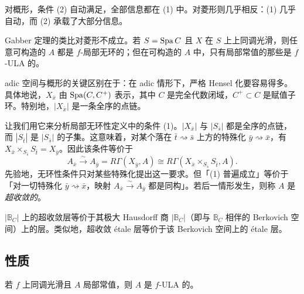 \begin{remark}
对概形，条件 (2) 自动满足，全部信息都在 (1) 中。对菱形则几乎相反：(1) 几乎自动，而 (2) 承载了大部分信息。
\end{remark}

\begin{example}
Gabber 定理的类比对菱形不成立。若 $S=\operatorname{Spa} C$ 且 $X$ 在 $S$ 上上同调光滑，则任意可构造的 $A$ 都是 $f$-局部无环的；但在可构造的 $A$ 中，只有局部常值的那些是 $f$-ULA 的。
\end{example}

\begin{center}
\end{center}
\begin{center}
\end{center}

\begin{remark}
adic 空间与概形的关键区别在于：在 adic 情形下，严格 Hensel 化要容易得多。具体地说，$X_{\bar x}$ 由 $\operatorname{Spa}(C,C^+)$ 表示，其中 $C$ 是完全代数闭域，$C^+\subset C$ 是赋值子环。特别地，$|X_{\bar x}|$ 是一条全序的点链。
\end{remark}

让我们用它来分析局部无环性定义中的条件 (1)。$|X_{\bar x}|$ 与 $|S_{\bar s}|$ 都是全序的点链，而 $|S_{\bar t}|$ 是 $|S_{\bar s}|$ 的子集。这意味着，对某个落在 $\bar t\rightsquigarrow\bar s$ 上方的特殊化 $\bar y\rightsquigarrow\bar x$，有 $X_{\bar x}\times_{S_{\bar s}}S_{\bar t}=X_{\bar y}$。因此该条件等价于
\[
A_{\bar x}\xrightarrow{\ \sim\ }A_{\bar y}=R\Gamma(X_{\bar y},A)\cong R\Gamma(X_{\bar x}\times_{S_{\bar s}}S_{\bar t},A).
\]
先验地，无环性条件只对某些特殊化提出这一要求。但「(1) 普遍成立」等价于「对一切特殊化 $\bar y\rightsquigarrow\bar x$，映射 $A_{\bar x}\xrightarrow{\sim}A_{\bar y}$ 都是同构」。若后一情形发生，则称 $A$ 是\emph{超收敛的}。

\begin{remark}
$|\mathbb B_C|$ 上的超收敛层等价于其极大 Hausdorff 商 $|\mathbb B_C|$（即与 $\mathbb B_C$ 相伴的 Berkovich 空间）上的层。类似地，超收敛 étale 层等价于该 Berkovich 空间上的 étale 层。
\end{remark}


\subsection{性质}

\begin{lemma}
若 $f$ 上同调光滑且 $A$ 局部常值，则 $A$ 是 $f$-ULA 的。
\end{lemma}

